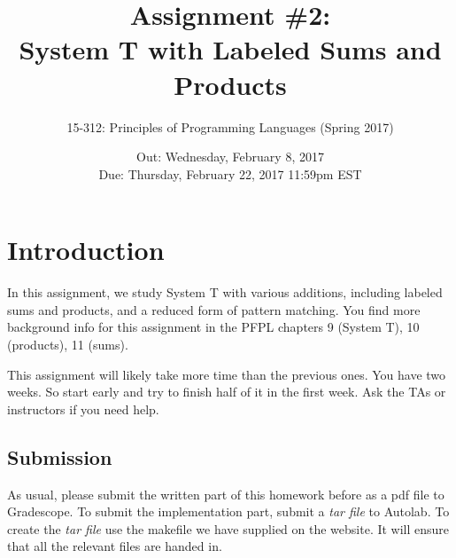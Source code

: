 \documentclass[11pt]{article}
\title{Assignment \#2: \\
        System T with Labeled Sums and Products}
\author{15-312: Principles of Programming Languages (Spring 2017)}
\date{Out: Wednesday, February 8, 2017\\
      Due: Thursday, February 22, 2017 11:59pm EST}
\begin{document}
\maketitle

\section*{Introduction}

In this assignment, we study System T with various additions,
including labeled sums and products, and a reduced form of pattern
matching. You find more background info
for this assignment in the PFPL chapters 9 (System T), 10 (products),
11 (sums).


This assignment will likely take more time than the previous ones. You
have two weeks. So start early and try to finish half of it in the
first week.  Ask the TAs or instructors if you need help.


\subsection*{Submission}

As usual, please submit the written part of this homework before as a
pdf file to Gradescope. To submit the implementation part, submit a
\emph{tar file} to Autolab. To create the \emph{tar file} use the
makefile we have supplied on the website. It will ensure that all the
relevant files are handed in.
\end{document}
